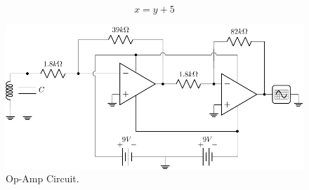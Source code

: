 \lipsum[1]

\begin{equation}
    x=y+5
\end{equation}

\begin{example}
    \lipsum[2]
\end{example}

\lipsum[3-4]

\begin{figure}
    \centering
    \includegraphics[width=0.75\linewidth]{Figures/Circuit.pdf}
    \caption{Op-Amp Circuit.}
    \label{fig:circuit}
\end{figure}

\lipsum[5]